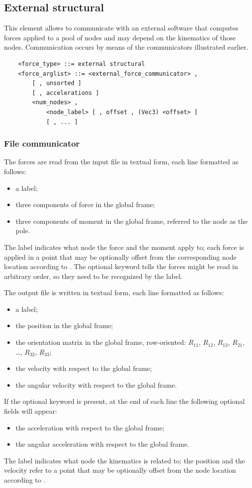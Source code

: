 \subsection{External structural}
This element allows to communicate with an external software that computes
forces applied to a pool of nodes and may depend on the kinematics of those
nodes.
Communication occurs by means of the communicators illustrated earlier.
\begin{verbatim}
    <force_type> ::= external structural
    <force_arglist> ::= <external_force_communicator> ,
        [ , unsorted ]
        [ , accelerations ]
        <num_nodes> ,
            <node_label> [ , offset , (Vec3) <offset> ]
            [ , ... ]
\end{verbatim}

\subsubsection{File communicator}
The forces are read from the input file in textual form,
each line formatted as follows:
\begin{itemize}
\item a label;
\item three components of force in the global frame;
\item three components of moment in the global frame, referred to the node as the pole.
\end{itemize}
The label indicates what node the force and the moment apply to; 
each force is applied in a point that may be optionally offset 
from the corresponding node location according to .
The optional keyword  tells the forces might be
read in arbitrary order, so they need to be recognized by the label.

The output file is written in textual form, each line formatted as follows:
\begin{itemize}
\item a label;
\item the position in the global frame;
\item the orientation matrix in the global frame, row-oriented:
$R_{11}$, $R_{12}$, $R_{13}$, $R_{21}$, \ldots, $R_{32}$, $R_{33}$;
\item the velocity with respect to the global frame;
\item the angular velocity with respect to the global frame.
\end{itemize}
If the optional keyword  is present,
at the end of each line the following optional fields will appear:
\begin{itemize}
\item the acceleration with respect to the global frame;
\item the angular acceleration with respect to the global frame.
\end{itemize}
The label indicates what node the kinematics is related to;
the position and the velocity refer to a point that may be optionally
offset from the node location according to .

